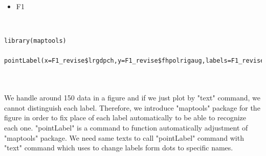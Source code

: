\documentclass[a4paper,11pt]{article}
\begin{document}

\thispagestyle{empty}




%



\newpage




\newpage
\tableofcontents
\clearpage



\newpage
{}




\newpage
{}
\ohead[]{\rightmark}
\listoffigures


\begin{itemize}
\item F1
\end{itemize}
\\
\begin{lstlisting}
library(maptools)

pointLabel(x=F1_revise$lrgdpch,y=F1_revise$fhpolrigaug,labels=F1_revise$code,col="black")
\end{lstlisting}
\\
\\

We handle around 150 data in a figure and if we just plot by "text" command, we cannot distinguish each label. Therefore, we introduce "maptools" package for the figure in order to fix place of each label automatically to be able to recognize each one. "pointLabel" is a command to function automatically adjustment of "maptools" package. We need same texts to call "pointLabel" command with "text" command which uses to change labels form dots to specific names. 
\\
\\
\end{document}
